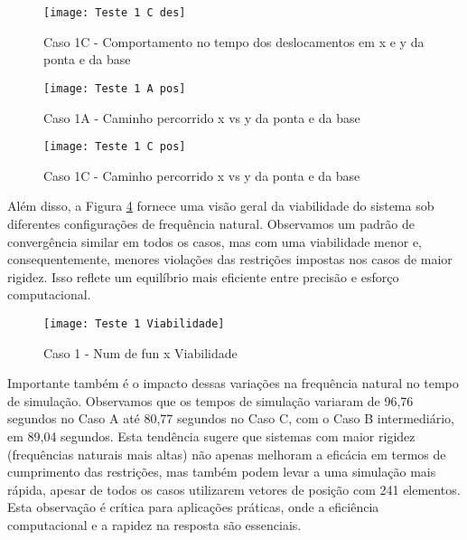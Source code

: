 \begin{figure}[H]
    \begin{center}
    \caption{Caso 1C - Comportamento no tempo dos deslocamentos em x e y da ponta e da base}
    \texttt{[image: Teste 1 C des]}
    \label{fig:t_1c_des}
    \end{center}
\end{figure}

\begin{figure}[H]
    \begin{center}
    \caption{Caso 1A - Caminho percorrido x vs y da ponta e da base}
    \texttt{[image: Teste 1 A pos]}
    \label{fig:t_1a_pos}
    \end{center}
\end{figure}

\begin{figure}[H]
    \begin{center}
    \caption{Caso 1C - Caminho percorrido x vs y da ponta e da base}
    \texttt{[image: Teste 1 C pos]}
    \label{fig:t_1c_pos}
    \end{center}
\end{figure}

Além disso, a Figura \ref{fig:t_1_viab} fornece uma visão geral da viabilidade do sistema sob diferentes configurações de frequência natural. Observamos um padrão de convergência similar em todos os casos, mas com uma viabilidade menor e, consequentemente, menores violações das restrições impostas nos casos de maior rigidez. Isso reflete um equilíbrio mais eficiente entre precisão e esforço computacional.

\begin{figure}[H]
    \begin{center}
    \caption{Caso 1 - Num de fun x Viabilidade}
    \texttt{[image: Teste 1 Viabilidade]}
    \label{fig:t_1_viab}
    \end{center}
\end{figure}

Importante também é o impacto dessas variações na frequência natural no tempo de simulação. Observamos que os tempos de simulação variaram de 96,76 segundos no Caso A até 80,77 segundos no Caso C, com o Caso B intermediário, em 89,04 segundos. Esta tendência sugere que sistemas com maior rigidez (frequências naturais mais altas) não apenas melhoram a eficácia em termos de cumprimento das restrições, mas também podem levar a uma simulação mais rápida, apesar de todos os casos utilizarem vetores de posição com 241 elementos. Esta observação é crítica para aplicações práticas, onde a eficiência computacional e a rapidez na resposta são essenciais.

